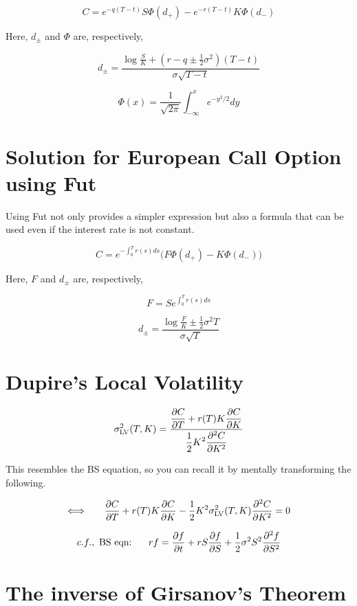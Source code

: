 \documentclass[uplatex]{jsarticle}
\begin{document}
\[
	C = e^{-q(T-t)} S \Phi(d_{+}) - e^{-r(T-t)} K \Phi(d_{-})
\]

Here, $d_{\pm}$ and $\Phi$ are, respectively,

\[
	d_{\pm} = \frac{ \displaystyle \log \frac{S}{K} + (r-q \pm \frac{1}{2} \sigma^{2} ) (T-t) }{ \sigma \sqrt{ T - t } }
\]

\[
	\Phi(x) = \frac{1}{ \sqrt{2 \pi} } \int^{x}_{- \infty} e^{-y^{2}/2} dy
\]


\section{Solution for European Call Option using Fut}

Using Fut not only provides a simpler expression but also a formula that can be used even if the interest rate is not constant.

\[
	C = e^{-\int^{T}_{0} r(s) ds} \Big( F \Phi(d_{+}) - K \Phi(d_{-}) \Big)
\]

Here, $F$ and $d_{\pm}$ are, respectively,

\[
	F = S e^{\int^{T}_{0} r(s) ds }
\]

\[
	d_{\pm} = \frac{ \displaystyle \log \frac{F}{K} \pm \frac{1}{2} \sigma^{2} T }{ \sigma \sqrt{ T } }
\]

\section{Dupire's Local Volatility}

\[
	\sigma_{\rm LV}^{2}(T,K)
	=
	\frac{
		\displaystyle
		\frac{\partial C}{\partial T} + r(T) K \frac{\partial C}{\partial K}
	}{
		\displaystyle
		\frac{1}{2} K^{2}
		\frac{\partial^{2} C}{\partial K^{2}}
	}
\]

This resembles the BS equation, so you can recall it by mentally transforming the following.

\[
	\Longleftrightarrow
	\ \hspace{5mm}
	\frac{\partial C}{\partial T} + r(T) K \frac{\partial C}{\partial K}
	-
	\frac{1}{2} K^{2}
	\sigma_{\rm LV}^{2}(T,K)
	\frac{\partial^{2} C}{\partial K^{2}}
	=0
\]

\[
	c.f., \
	\text{BS eqn:}
	\ \hspace{5mm}
	rf
	=
	\frac{\partial f}{\partial t}
	+
	r S \frac{\partial f}{\partial S}
	+
	\frac{1}{2} \sigma^{2} S^{2}
	\frac{\partial^{2} f}{\partial S^{2}}
\]



\section{The inverse of Girsanov's Theorem}
\end{document}
